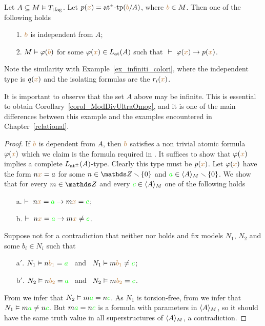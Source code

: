 \begin{proposition}\label{prop_tfag_tipi_princ_comp}
Let $A\subseteq M\models T_{\rm tfag}$.
%
 Let $p({\mr x})=\atpmtp({\mr b}/A)$, where ${\mr b} \in M$.
%
Then one of the following holds   
\begin{itemize}
\item[1.] ${\mr b}$ is independent from $A$;
\item[2.] $M\models\phi({\mr b})$ for some $\phi({\mr x})\in L_{\rm at}(A)$ such that $\ \proves\ \phi({\mr x})\imp p({\mr x})$.
\end{itemize}
\end{proposition}

Note the similarity with Example~\ref{ex_infiniti_colori}, where the independent type is $q({\mr x})$ and the isolating formulas are the $r_i({\mr x})$.

It is important to observe that the set $A$ above may be infinite.
%
This is essential to obtain Corollary~\ref{corol_ModDivUltraOmog}, and it is one of the main differences between this example and the examples encountered in Chapter~\ref{relational}.

\begin{proof}
If ${\mr b}$ is dependent from $A$, then ${\mr b}$ satisfies a non trivial atomic formula $\phi({\mr x})$ which we claim is the formula required in .
%
It suffices to show that $\phi({\mr x})$ implies a complete $L_{\rm at^\pm}(A)$-type.
%
Clearly this type must be $p({\mr x})$.
%
Let $\phi({\mr x})$ have the form $n{\mr x}=a$ for some $n\in\ZZ\sm\{0\}$ and ${\gr a}\in\<A\>_M\sm\{0\}$.
%
We show that for every $m\in\ZZ$ and every ${\gr c}\in\<A\>_M$ one of the following holds
\begin{itemize}
\item[a.] $\proves\   n{\mr x}={\gr a}\imp m{\mr x}={\gr c}$;
\item[b.] $\proves\   n{\mr x}={\gr a}\imp m{\mr x}\neq {\gr c}$.
\end{itemize} 
Suppose not for a contradiction that neither  nor  holds and fix models $N_1$, $N_2$ and some $b_i\in N_i$ such that
\begin{itemize}
\item[a$'$.] $N_1\models n{\mr b_1}={\gr a}$ \ and \ $N_1\models m{\mr b_1}\neq {\gr c}$;
\item[b$'$.] $N_2\models n{\mr b_2}={\gr a}$ \ and \ $N_2\models m{\mr b_2} = {\gr c}$.
\end{itemize} 
From  we infer that $N_2\models m{\gr a}=n{\gr c}$.
%
%
As $N_1$ is torsion-free, from  we infer that $N_1\models m{\gr a}\neq n{\gr c}$.
%
But $m{\gr a}=n{\gr c}$ is a formula with parameters in $\<A\>_M$, so it should have the same truth value in all superstructures of $\<A\>_M$, a contradiction.
\end{proof}




